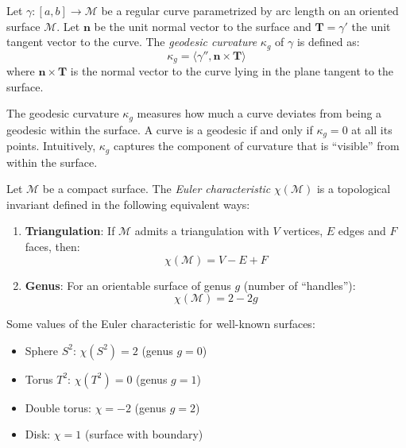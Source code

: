 \begin{definition}\label{def:curvatura_geodesica}
Let $\gamma: [a,b] \to \mathcal{M}$ be a regular curve parametrized by arc  length on an oriented surface $\mathcal{M}$. Let $\mathbf{n}$ be the unit  normal vector to the surface and $\mathbf{T} = \gamma'$ the unit tangent  vector to the curve. The \textit{geodesic curvature} $\kappa_g$ of $\gamma$ is defined as:
\begin{equation}\label{eq:curvatura_geodesica}
\kappa_g = \langle \gamma'', \mathbf{n} \times \mathbf{T} \rangle
\end{equation}
where $\mathbf{n} \times \mathbf{T}$ is the normal vector to the curve lying in the plane tangent to the surface.
\end{definition}

\begin{remark}
The geodesic curvature $\kappa_g$ measures how much a curve deviates from being a geodesic within the surface. A curve is a geodesic if and only if $\kappa_g = 0$ at all its points. Intuitively, $\kappa_g$ captures the component of curvature that is ``visible'' from within the surface.
\end{remark}

\begin{definition}\label{def:caracteristica_euler}
Let $\mathcal{M}$ be a compact surface. The \textit{Euler characteristic} $\chi(\mathcal{M})$ is a topological invariant defined in the following equivalent ways:
\begin{enumerate}
    \item \textbf{Triangulation}: If $\mathcal{M}$ admits a triangulation with $V$ vertices, $E$ edges and $F$ faces, then:
          \begin{equation}\label{eq:euler_triangulacion}
          \chi(\mathcal{M}) = V - E + F
          \end{equation}

    \item \textbf{Genus}: For an orientable surface of genus $g$ (number of ``handles''):
          \begin{equation}\label{eq:euler_genero}
          \chi(\mathcal{M}) = 2 - 2g
          \end{equation}
\end{enumerate}
\end{definition}

\begin{example}\label{ex:euler_superficies}
Some values of the Euler characteristic for well-known surfaces:
\begin{itemize}
    \item Sphere $S^2$: $\chi(S^2) = 2$ (genus $g = 0$)
    \item Torus $T^2$: $\chi(T^2) = 0$ (genus $g = 1$)
    \item Double torus: $\chi = -2$ (genus $g = 2$)
    \item Disk: $\chi = 1$ (surface with boundary)
\end{itemize}
\end{example}

